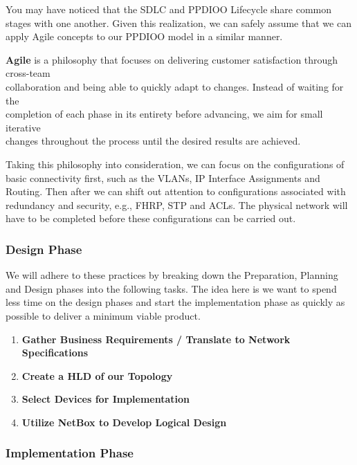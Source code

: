 \documentclass[12pt, letterpaper]{article}
\begin{document}
You may have noticed that the SDLC and PPDIOO Lifecycle share common stages with one another. Given this realization, we can safely assume that we can apply Agile concepts to our PPDIOO model in a similar manner.

\smallskip

\textbf{Agile} is a philosophy that focuses on delivering customer satisfaction through cross-team \\ collaboration and being able to quickly adapt to changes. Instead of waiting for the \\ completion of each phase in its entirety before advancing, we aim for small iterative \\ changes throughout the process until the desired results are achieved.

\smallskip

Taking this philosophy into consideration, we can focus on the configurations of basic connectivity first, such as the VLANs, IP Interface Assignments and Routing. Then after we can shift out attention to configurations associated with redundancy and security, e.g., FHRP, STP and ACLs. The physical network will have to be completed before these configurations can be carried out.

\subsubsection{Design Phase}

We will adhere to these practices by breaking down the Preparation, Planning and Design phases into the following tasks. The idea here is we want to spend less time on the design phases and start the implementation phase as quickly as possible to deliver a minimum viable product.

\begin{enumerate}
\item \textbf{Gather Business Requirements / Translate to Network Specifications}
\item \textbf{Create a HLD of our Topology}
\item \textbf{Select Devices for Implementation}
\item \textbf{Utilize NetBox to Develop Logical Design}
\end{enumerate}

\subsubsection{Implementation Phase}
\end{document}
